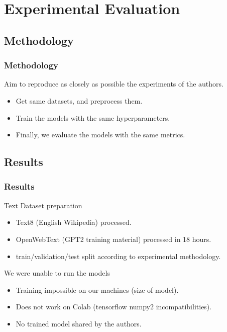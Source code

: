 \documentclass[10pt, aspectratio = 169]{beamer}
\begin{document}
\section{Experimental Evaluation}
\subsection{Methodology}
\begin{frame}
    \frametitle{Methodology}
    Aim  to reproduce as closely as possible the experiments of the authors. 
    \begin{itemize}
        \item Get same datasets, and preprocess them.
        \item Train the models with the same hyperparameters.
        \item Finally, we evaluate the models with the same metrics.
    \end{itemize}

        
\end{frame}

\subsection{Results}
\begin{frame}
    \frametitle{Results}
    \begin{exampleblock}{Text Dataset preparation}
        \begin{itemize}
            \item Text8 (English Wikipedia) processed.
            \item OpenWebText (GPT2 training material) processed in 18 hours.
            \item train/validation/test split according to experimental methodology.
        \end{itemize}
    \end{exampleblock}

    \begin{alertblock}{We were unable to run the models}
        \begin{itemize}
            \item Training impossible on our machines (size of model).
            \item Does not work on Colab (tensorflow numpy2 incompatibilities).
            \item No trained model shared by the authors.
        \end{itemize}
    \end{alertblock}
    
\end{frame}
\end{document}
